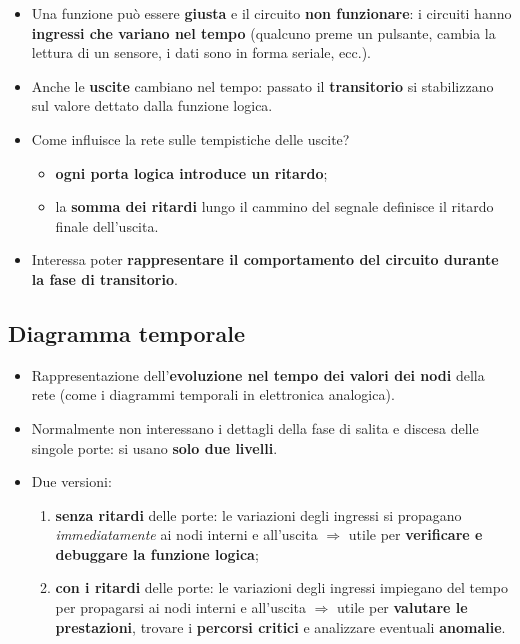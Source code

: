 \documentclass[12pt, a4paper]{article}
\begin{document}
\begin{itemize}
    \item Una funzione può essere \textbf{giusta} e il circuito \textbf{non funzionare}: i circuiti hanno \textbf{ingressi che variano nel tempo} (qualcuno preme un pulsante, cambia la lettura di un sensore, i dati sono in forma seriale, ecc.).
    \item Anche le \textbf{uscite} cambiano nel tempo: passato il \textbf{transitorio} si stabilizzano sul valore dettato dalla funzione logica.
    \item Come influisce la rete sulle tempistiche delle uscite?
    \begin{itemize}
        \item \textbf{ogni porta logica introduce un ritardo};
        \item la \textbf{somma dei ritardi} lungo il cammino del segnale definisce il ritardo finale dell'uscita.
    \end{itemize}
    \item Interessa poter \textbf{rappresentare il comportamento del circuito durante la fase di transitorio}.
\end{itemize}

\subsection{Diagramma temporale}

\begin{itemize}
    \item Rappresentazione dell'\textbf{evoluzione nel tempo dei valori dei nodi} della rete (come i diagrammi temporali in elettronica analogica).
    \item Normalmente non interessano i dettagli della fase di salita e discesa delle singole porte: si usano \textbf{solo due livelli}.
    \item Due versioni:
    \begin{enumerate}
        \item \textcolor{blue!70!black}{\textbf{senza ritardi}} delle porte: le variazioni degli ingressi si propagano \emph{immediatamente} ai nodi interni e all'uscita $\Rightarrow$ utile per \textbf{verificare e debuggare la funzione logica};
        \item \textcolor{red!80!black}{\textbf{con i ritardi}} delle porte: le variazioni degli ingressi impiegano del tempo per propagarsi ai nodi interni e all'uscita $\Rightarrow$ utile per \textbf{valutare le prestazioni}, trovare i \textbf{percorsi critici} e analizzare eventuali \textbf{anomalie}.
    \end{enumerate}
\end{itemize}
\end{document}
